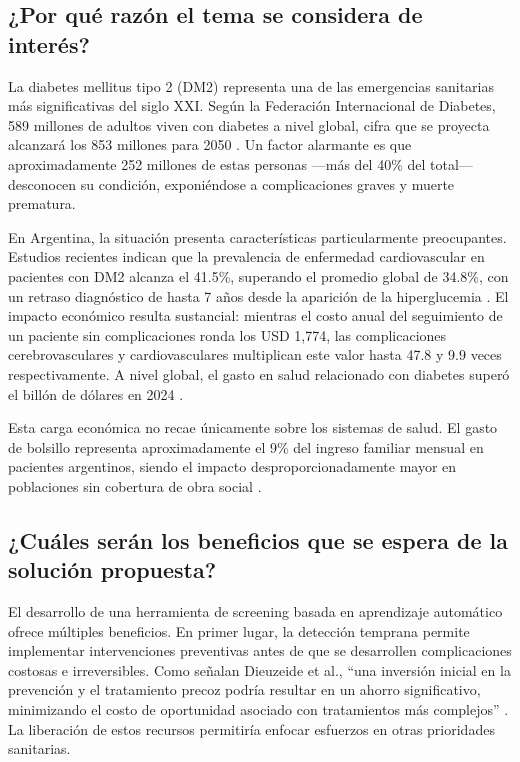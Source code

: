 \documentclass[12pt, a4paper]{report}
\begin{document}
\subsection{¿Por qué razón el tema se considera de interés?}

La diabetes mellitus tipo 2 (DM2) representa una de las emergencias sanitarias más significativas del siglo XXI. Según la Federación Internacional de Diabetes, 589 millones de adultos viven con diabetes a nivel global, cifra que se proyecta alcanzará los 853 millones para 2050 \citep{idf2025atlas}. Un factor alarmante es que aproximadamente 252 millones de estas personas —más del 40\% del total— desconocen su condición, exponiéndose a complicaciones graves y muerte prematura.

En Argentina, la situación presenta características particularmente preocupantes. Estudios recientes indican que la prevalencia de enfermedad cardiovascular en pacientes con DM2 alcanza el 41.5\%, superando el promedio global de 34.8\%, con un retraso diagnóstico de hasta 7 años desde la aparición de la hiperglucemia \citep{dieuzeide2025impacto}. El impacto económico resulta sustancial: mientras el costo anual del seguimiento de un paciente sin complicaciones ronda los USD 1,774, las complicaciones cerebrovasculares y cardiovasculares multiplican este valor hasta 47.8 y 9.9 veces respectivamente. A nivel global, el gasto en salud relacionado con diabetes superó el billón de dólares en 2024 \citep{idf2025atlas}.

Esta carga económica no recae únicamente sobre los sistemas de salud. El gasto de bolsillo representa aproximadamente el 9\% del ingreso familiar mensual en pacientes argentinos, siendo el impacto desproporcionadamente mayor en poblaciones sin cobertura de obra social \citep{linari2019calidad}.

\subsection{¿Cuáles serán los beneficios que se espera de la solución propuesta?}

El desarrollo de una herramienta de screening basada en aprendizaje automático ofrece múltiples beneficios. En primer lugar, la detección temprana permite implementar intervenciones preventivas antes de que se desarrollen complicaciones costosas e irreversibles. Como señalan Dieuzeide et al., ``una inversión inicial en la prevención y el tratamiento precoz podría resultar en un ahorro significativo, minimizando el costo de oportunidad asociado con tratamientos más complejos'' \citep{dieuzeide2025impacto}. La liberación de estos recursos permitiría enfocar esfuerzos en otras prioridades sanitarias.
\end{document}
